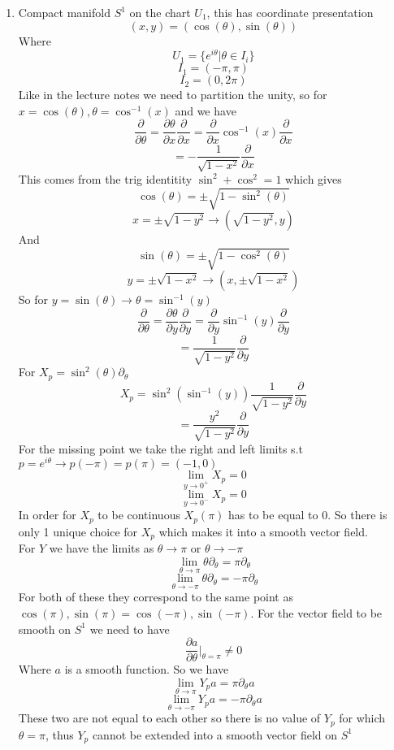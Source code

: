 \documentclass[12pt]{article}
\begin{document}
\begin{enumerate}
\item Compact manifold $S^1$ on the chart $U_1$, this has coordinate presentation 
$$ (x,y) = (\cos(\theta), \sin(\theta)) $$
Where 
$$ U_1 = \{ e^{i \theta} | \theta \in I_i \} $$
$$ I_1 = ( - \pi, \pi ) $$
$$ I_2 = (0, 2\pi) $$
Like in the lecture notes we need to partition the unity, so for $x = \cos (\theta), \theta = \cos^{-1} (x)$ and we have 
$$ \frac{\partial}{\partial \theta} = \frac{\partial \theta}{\partial x} \frac{\partial}{\partial x} = \frac{\partial}{\partial x} \cos^{-1} (x) \frac{\partial}{\partial x} $$
$$ = - \frac{1}{\sqrt{1-x^2}} \frac{\partial}{\partial x} $$
This comes from the trig identitity $\sin^2 + \cos^2 =1$ which gives 
$$ \cos (\theta) = \pm \sqrt{1-\sin^2 (\theta)} $$
$$ x = \pm \sqrt{1-y^2} \rightarrow (\sqrt{1-y^2}, y) $$
And 
$$ \sin (\theta) = \pm \sqrt{1- \cos^2 (\theta) } $$
$$ y = \pm \sqrt{1- x^2} \rightarrow (x, \pm \sqrt{1-x^2}) $$
So for $y = \sin (\theta) \rightarrow \theta = \sin^{-1} (y) $
$$ \frac{\partial}{\partial \theta} = \frac{\partial \theta}{\partial y} \frac{\partial}{\partial y} = \frac{\partial}{\partial y} \sin^{-1} (y) \frac{\partial}{\partial y} $$
$$ = \frac{1}{\sqrt{1-y^2}} \frac{\partial}{\partial y} $$
For $X_p = \sin^2 ( \theta) \partial_{\theta}$
$$ X_p = \sin^2 ( \sin^{-1} (y)) \frac{1}{\sqrt{1-y^2}} \frac{\partial}{\partial y} $$
$$ = \frac{y^2}{\sqrt{1-y^2}} \frac{\partial}{\partial y} $$
For the missing point we take the right and left limits s.t $p = e^{i \theta} \rightarrow p(- \pi) = p( \pi) = (-1,0)$ 
$$ \lim_{y \to 0^+} X_p =0 $$
$$ \lim_{y \to 0^-} X_p =0 $$
In order for $X_p$ to be continuous $X_p (\pi)$ has to be equal to 0. So there is only 1 unique choice for $X_p$ which makes it into a smooth vector field. 
\\
For $Y$ we have the limits as $\theta \to \pi$ or $\theta \to - \pi$ 
$$ \lim_{\theta \to \pi} \theta \partial_{\theta} = \pi \partial_{\theta} $$
$$ \lim_{\theta \to - \pi} \theta \partial_{\theta} = - \pi \partial_{\theta} $$
For both of these they correspond to the same point as $\cos(\pi), \sin(\pi) = \cos(-\pi), \sin(-\pi)$. 
For the vector field to be smooth on $S^1$ we need to have 
$$ \frac{\partial a}{\partial \theta} |_{\theta = \pi} \neq 0 $$
Where $a$ is a smooth function. So we have 
$$ \lim_{\theta \to \pi} Y_p a = \pi \partial_{\theta} a $$
$$ \lim_{\theta \to - \pi} Y_p a = - \pi \partial_{\theta} a $$ 
These two are not equal to each other so there is no value of $Y_p$ for which $\theta = \pi$, thus $Y_p$ cannot be extended into a smooth vector field on $S^1$ 


\end{enumerate}
\end{document}

